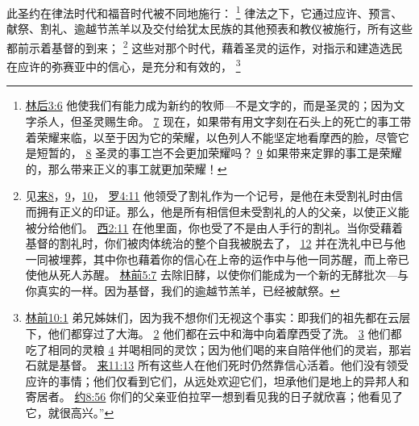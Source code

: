 \documentclass[12pt, a4paper, oneside]{ctexart}
\newcounter{parnum}[section]
\newcommand{\N}{%
   \noindent\refstepcounter{parnum}%
    \makebox[\parindent][l]{\textbf{\arabic{parnum}.}}}
\begin{document}
\N 此圣约在律法时代和福音时代被不同地施行：
	\footnote {
		\href{https://biblehub.com/2_corinthians/3-6.htm}{林后3:6} 他使我们有能力成为新约的牧师---不是文字的，而是圣灵的；因为文字杀人，但圣灵赐生命。
		\href{https://biblehub.com/2_corinthians/3-7.htm}{7} 现在，如果带有用文字刻在石头上的死亡的事工带着荣耀来临，以至于因为它的荣耀，以色列人不能坚定地看摩西的脸，尽管它是短暂的，
		\href{https://biblehub.com/2_corinthians/3-8.htm}{8} 圣灵的事工岂不会更加荣耀吗？
		\href{https://biblehub.com/2_corinthians/3-9.htm}{9} 如果带来定罪的事工是荣耀的，那么带来正义的事工就更加荣耀！
	}
	律法之下，它通过应许、预言、献祭、割礼、逾越节羔羊以及交付给犹太民族的其他预表和教仪被施行，所有这些都前示着基督的到来；
	\footnote {
		见\href{https://biblehub.com/niv/hebrews/8.htm}{来8}，\href{https://biblehub.com/niv/hebrews/9.htm}{9}，\href{https://biblehub.com/niv/hebrews/10.htm}{10}，
		\href{https://biblehub.com/romans/4-11.htm}{罗4:11} 他领受了割礼作为一个记号，是他在未受割礼时由信而拥有正义的印证。那么，他是所有相信但未受割礼的人的父亲，以使正义能被分给他们。
		\href{https://biblehub.com/colossians/2-11.htm}{西2:11} 在他里面，你也受了不是由人手行的割礼。当你受藉着基督的割礼时，你们被肉体统治的整个自我被脱去了，
		\href{https://biblehub.com/colossians/2-12.htm}{12} 并在洗礼中已与他一同被埋葬，其中你也藉着你的信心在上帝的运作中与他一同苏醒，而上帝已使他从死人苏醒。
		\href{https://biblehub.com/1_corinthians/5-7.htm}{林前5:7} 去除旧酵，以使你们能成为一个新的无酵批次---与你真实的一样。因为基督，我们的逾越节羔羊，已经被献祭。
	}
	这些对那个时代，藉着圣灵的运作，对指示和建造选民在应许的弥赛亚中的信心，是充分和有效的，
	\footnote {
		\href{https://biblehub.com/1_corinthians/10-1.htm}{林前10:1} 弟兄姊妹们，因为我不想你们无视这个事实：即我们的祖先都在云层下，他们都穿过了大海。
		\href{https://biblehub.com/1_corinthians/10-2.htm}{2} 他们都在云中和海中向着摩西受了洗。
		\href{https://biblehub.com/1_corinthians/10-3.htm}{3} 他们都吃了相同的灵粮
		\href{https://biblehub.com/1_corinthians/10-4.htm}{4} 并喝相同的灵饮；因为他们喝的来自陪伴他们的灵岩，那岩石就是基督。
		\href{https://biblehub.com/hebrews/11-13.htm}{来11:13} 所有这些人在他们死时仍然靠信心活着。他们没有领受应许的事情；他们仅看到它们，从远处欢迎它们，坦承他们是地上的异邦人和寄居者。
		\href{https://biblehub.com/john/8-56.htm}{约8:56} 你们的父亲亚伯拉罕一想到看见我的日子就欣喜；他看见了它，就很高兴。”
	}
\end{document}
